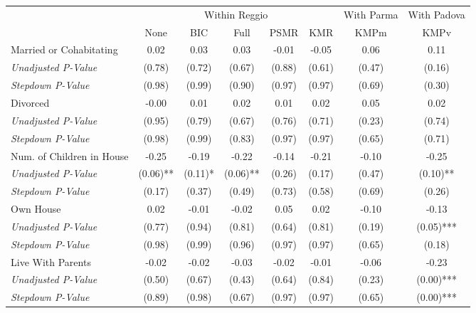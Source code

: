 \begin{tabular}{l c c c c c c c}
\toprule
& \multicolumn{5}{c}{Within Reggio} & With Parma & With Padova \\\cmidrule(lr){2-6} \cmidrule(lr){7-7} \cmidrule(lr){8-8}
 & None & BIC & Full & PSMR & KMR & KMPm & KMPv \\
\midrule
Married or Cohabitating & 0.02 & 0.03 & 0.03 & -0.01 & -0.05 & 0.06 & 0.11 \\
\quad \textit{Unadjusted P-Value} & (0.78) & (0.72) & (0.67) & (0.88) & (0.61) & (0.47) & (0.16) \\
\quad \textit{Stepdown P-Value} & (0.98) & (0.99) & (0.90) & (0.97) & (0.97) & (0.69) & (0.30) \\
Divorced & -0.00 & 0.01 & 0.02 & 0.01 & 0.02 & 0.05 & 0.02 \\
\quad \textit{Unadjusted P-Value} & (0.95) & (0.79) & (0.67) & (0.76) & (0.71) & (0.23) & (0.74) \\
\quad \textit{Stepdown P-Value} & (0.98) & (0.99) & (0.83) & (0.97) & (0.97) & (0.65) & (0.71) \\
Num. of Children in House & -0.25 & -0.19 & -0.22 & -0.14 & -0.21 & -0.10 & -0.25 \\
\quad \textit{Unadjusted P-Value} & (0.06)** & (0.11)* & (0.06)** & (0.26) & (0.17) & (0.47) & (0.10)** \\
\quad \textit{Stepdown P-Value} & (0.17) & (0.37) & (0.49) & (0.73) & (0.58) & (0.69) & (0.26) \\
Own House & 0.02 & -0.01 & -0.02 & 0.05 & 0.02 & -0.10 & -0.13 \\
\quad \textit{Unadjusted P-Value} & (0.77) & (0.94) & (0.81) & (0.64) & (0.81) & (0.19) & (0.05)*** \\
\quad \textit{Stepdown P-Value} & (0.98) & (0.99) & (0.96) & (0.97) & (0.97) & (0.65) & (0.18) \\
Live With Parents & -0.02 & -0.02 & -0.03 & -0.02 & -0.01 & -0.06 & -0.23 \\
\quad \textit{Unadjusted P-Value} & (0.50) & (0.67) & (0.43) & (0.64) & (0.84) & (0.23) & (0.00)*** \\
\quad \textit{Stepdown P-Value} & (0.89) & (0.98) & (0.67) & (0.97) & (0.97) & (0.65) & (0.00)*** \\
\bottomrule
\end{tabular}
